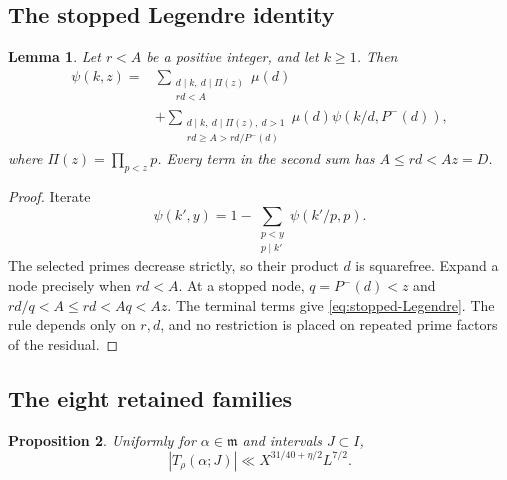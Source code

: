 \documentclass{amsart}
\newtheorem{lemma}{Lemma}[section]
\newtheorem{proposition}[lemma]{Proposition}
\newcounter{fact}
\numberwithin{equation}{section}
\numberwithin{table}{section}
\newcommand{\m}{\mathfrak m}
\begin{document}
\subsection{The stopped Legendre identity}

\begin{lemma}\label{lem:stopped-Legendre}
Let $r<A$ be a positive integer, and let $k\ge1$. Then
\begin{equation}\label{eq:stopped-Legendre}
\begin{split}
\psi(k,z)
={}&\sum_{\substack{d\mid k,\ d\mid\Pi(z)\\rd<A}}\mu(d)\\
&+\sum_{\substack{d\mid k,\ d\mid\Pi(z),\ d>1\\
rd\ge A>rd/P^-(d)}}
\mu(d)\psi(k/d,P^-(d)),
\end{split}
\end{equation}
where $\Pi(z)=\prod_{p<z}p$.
Every term in the second sum has $A\le rd<Az=D$.
\end{lemma}

\begin{proof}
Iterate
\[
\psi(k',y)=1-\sum_{\substack{p<y\\p\mid k'}}\psi(k'/p,p).
\]
The selected primes decrease strictly, so their product $d$ is
squarefree. Expand a node precisely when $rd<A$.
At a stopped node, $q=P^-(d)<z$ and
$rd/q<A\le rd<Aq<Az$.
The terminal terms give \eqref{eq:stopped-Legendre}.
The rule depends only on $r,d$, and no restriction is placed on repeated
prime factors of the residual.
\end{proof}

\subsection{The eight retained families}

\begin{proposition}\label{prop:minor-rho}
Uniformly for $\alpha\in\m$ and intervals $J\subset I$,
\begin{equation}
|T_\rho(\alpha;J)|\ll X^{31/40+\eta/2}L^{7/2}.
\end{equation}
\end{proposition}
\end{document}
